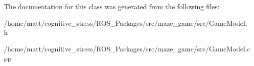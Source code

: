 The documentation for this class was generated from the following files\-:\begin{DoxyCompactItemize}
\item 
/home/matt/cognitive\-\_\-stress/\-R\-O\-S\-\_\-\-Packages/src/maze\-\_\-game/src/Game\-Model.\-h\item 
/home/matt/cognitive\-\_\-stress/\-R\-O\-S\-\_\-\-Packages/src/maze\-\_\-game/src/Game\-Model.\-cpp\end{DoxyCompactItemize}
